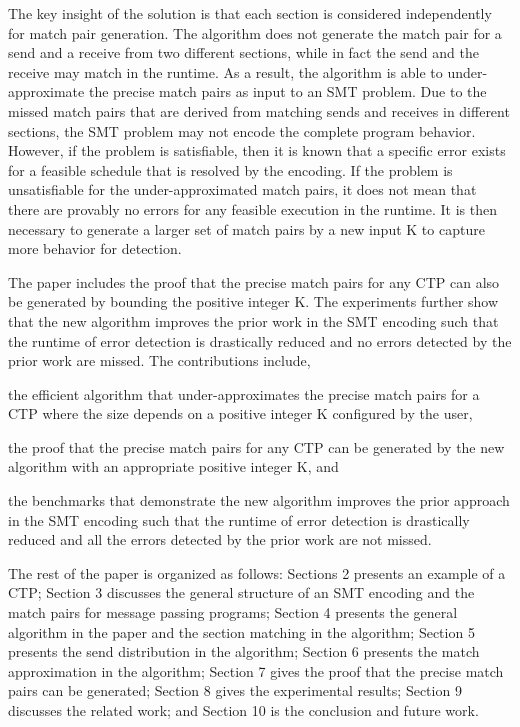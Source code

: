The key insight of the solution is that each section is considered independently for match pair generation.  
The algorithm does not generate the match pair for a send and a receive from two different sections, while in fact the send and the receive may match in the runtime. 
As a result, the algorithm is able to under-approximate the precise match pairs as input to an SMT problem. 
Due to the missed match pairs that are derived from matching sends and receives in different sections, the SMT problem may not encode the complete program behavior. However, if the problem is satisfiable, then it is known that a specific error exists for a feasible schedule that is resolved by the encoding. If the problem is unsatisfiable for the under-approximated match pairs, it does not mean that there are provably no errors for any feasible execution in the runtime. It is then necessary to generate a larger set of match pairs by a new input K to capture more behavior for detection.


The paper includes the proof that the precise match pairs for any CTP can also be generated by bounding the positive integer K. The experiments further show that the new algorithm improves the prior work in the SMT encoding such that the runtime of error detection is drastically reduced and no errors detected by the prior work are missed.
The contributions include,
\begin{compactitem}
\item the efficient algorithm that under-approximates the precise match pairs for a CTP where the size depends on a positive integer K configured by the user,
\item the proof that the precise match pairs for any CTP can be generated by the new algorithm with an appropriate positive integer K, and
\item the benchmarks that demonstrate the new algorithm improves the prior approach in the SMT encoding such that the runtime of error detection is drastically reduced and all the errors detected by the prior work are not missed. 
\end{compactitem}

The rest of the paper is organized as follows: 
Sections 2 presents an example of a CTP; Section 3 discusses the general structure of an SMT encoding and the match pairs for message passing programs;  Section 4 presents the general algorithm in the paper and the section matching in the algorithm; Section 5 presents the send distribution in the algorithm; Section 6 presents the match approximation in the algorithm; Section 7 gives the proof that the precise match pairs can be generated; Section 8 gives the experimental results; Section 9 discusses the related work; and Section 10 is the conclusion and future work.
